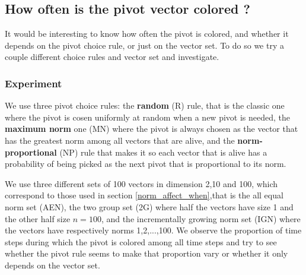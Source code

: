 \documentclass[12pt]{article}
\begin{document}
\subsection{How often is the pivot vector colored ?}\label{pivot_colored}
It would be interesting to know how often the pivot is colored, and whether it depends on the pivot choice rule, or just on the vector set. To do so we try a couple different choice rules and vector set and investigate.
\subsubsection{Experiment}
We use three pivot choice rules: the \textbf{random} (R) rule, that is the classic one where the pivot is cosen uniformly at random when a new pivot is needed, the \textbf{maximum norm} one (MN) where the pivot is always chosen as the vector that has the greatest norm among all vectors that are alive, and the \textbf{norm-proportional} (NP) rule that makes it so each vector that is alive has a probability of being picked as the next pivot that is proportional to its norm. 

We use three different sets of 100 vectors in dimension 2,10 and 100, which correspond to those used in section \ref{norm_affect_when},that is the all equal norm set (AEN), the two group set (2G) where half the vectors have size 1 and the other half size $n=100$, and the incrementally growing norm set (IGN) where the vectors have respectively norms 1,2,...,100. We observe the proportion of time steps during which the pivot is colored among all time steps and try to see whether the pivot rule seems to make that proportion vary or whether it only depends on the vector set.
\end{document}
